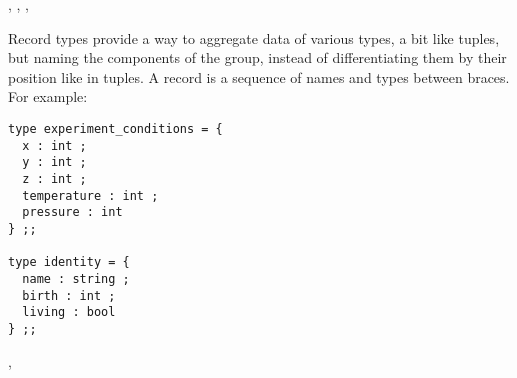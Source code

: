 \bigskip



\vspace{0.2cm}
\begin{syn}
 \is
  \tok{(}  \tok{)}
\sep
{} \is
  \tok{(}  \tok{)}
\sep
{} \is
  \tok{\vertical}  
\sep
{} \is
     \tok{=}
\end{syn}
\vspace{0.2cm}


\vspace{0.5cm}
\label{record-type-definition}

\bigskip

Record types provide a way to aggregate data of various types, a bit like
tuples, but naming the components of the group, instead of
differentiating them by their position like in tuples. A record is
a sequence of names and types between braces. For example:
{\scriptsize
\begin{lstlisting}
type experiment_conditions = {
  x : int ;
  y : int ;
  z : int ;
  temperature : int ;
  pressure : int
} ;;

type identity = {
  name : string ;
  birth : int ;
  living : bool
} ;;
\end{lstlisting}
}

\vspace{0.2cm}
\begin{syn}
 \is
   \tok{=}  \tok{;}
\sep
{} \is
     \tok{=}
  \tok{\{}  \tok{\}}
\end{syn}

